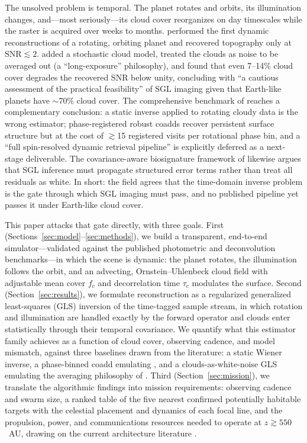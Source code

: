 ﻿\documentclass[twocolumn]{emulateapj}
\begin{document}
The unsolved problem is temporal. The planet rotates and orbits, its
illumination changes, and---most seriously---its cloud cover reorganizes
on day timescales while the raster is acquired over weeks to months.
\citet{toth23} performed the first dynamic reconstructions of a rotating,
orbiting planet and recovered topography only at
$\mathrm{SNR}\lesssim2$. \citet{toth25clouds} added a stochastic cloud
model, treated the clouds as noise to be averaged out (a
``long-exposure'' philosophy), and found that even 7--14\% cloud cover
degrades the recovered SNR below unity, concluding with ``a cautious
assessment of the practical feasibility'' of SGL imaging given that
Earth-like planets have $\sim$70\% cloud cover. The comprehensive
benchmark of \citet{tur26bench} reaches a complementary conclusion: a
static inverse applied to rotating cloudy data is the wrong estimator;
phase-registered robust coadds recover persistent surface structure but
at the cost of $\gtrsim$15 registered visits per rotational phase bin,
and a ``full spin-resolved dynamic retrieval pipeline'' is explicitly
deferred as a next-stage deliverable. The covariance-aware biosignature
framework of \citet{cov26} likewise argues that SGL inference must
propagate structured error terms rather than treat all residuals as
white. In short: the field agrees that the time-domain inverse problem is
the gate through which SGL imaging must pass, and no published pipeline
yet passes it under Earth-like cloud cover.

This paper attacks that gate directly, with three goals. First
(Sections~\ref{sec:model}--\ref{sec:methods}), we build a transparent,
end-to-end simulator---validated against the published photometric and
deconvolution benchmarks---in which the scene is dynamic: the planet
rotates, the illumination follows the orbit, and an advecting,
Ornstein--Uhlenbeck cloud field with adjustable mean cover $f_c$ and
decorrelation time $\tau_c$ modulates the surface. Second
(Section~\ref{sec:results}), we formulate reconstruction as a regularized
generalized least-squares (GLS) inversion of the time-tagged sample
stream, in which rotation and illumination are handled exactly by the
forward operator and clouds enter statistically through their temporal
covariance. We quantify what this estimator family achieves as a
function of cloud cover, observing cadence, and model mismatch, against
three baselines drawn from the literature: a static Wiener inverse, a
phase-binned coadd emulating \citet{tur26bench}, and a
clouds-as-white-noise GLS emulating the averaging philosophy of
\citet{toth25clouds}. Third (Section~\ref{sec:mission}), we translate the
algorithmic findings into mission requirements: observing cadence and
swarm size, a ranked table of the five nearest confirmed potentially
habitable targets with the celestial placement and dynamics of each
focal line, and the propulsion, power, and communications resources
needed to operate at $z\gtrsim550$~AU, drawing on the current
architecture literature \citep{niac20,helvajian23,friedman24,tur26prop}.
\end{document}
